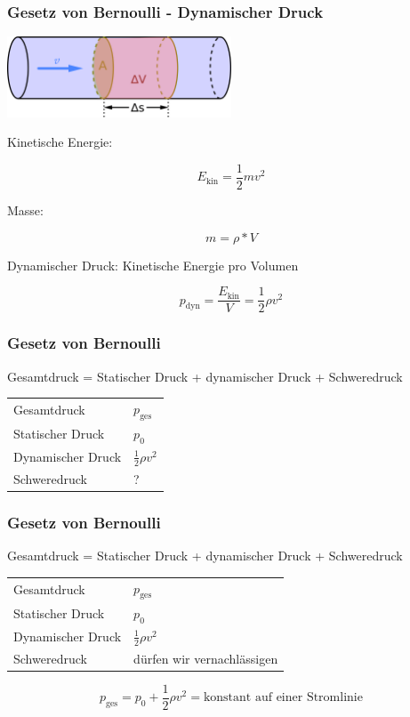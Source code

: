 \documentclass{beamer}
\begin{document}
\begin{frame}
\frametitle{Gesetz von Bernoulli - Dynamischer Druck}

\begin{center}
\includegraphics[width=0.5\textwidth]{volumenstrom.png}
\end{center}

Kinetische Energie:

\[
E_{\text{kin}} = \frac{1}{2} m v^2
\]

\pause
Masse: 

\[
m = \rho * V
\]

\pause
Dynamischer Druck: Kinetische Energie pro Volumen

\[
p_{\text{dyn}} = \frac{E_{\text{kin}}}{V} =  \frac{1}{2} \rho v^2
\]


\end{frame}


\begin{frame}
\frametitle{Gesetz von Bernoulli}



Gesamtdruck = Statischer Druck + dynamischer Druck + Schweredruck \\[0.5 cm]


\begin{tabular}{ll}
Gesamtdruck     & \(p_{\text{ges}}\)     \\[0.2 cm]
Statischer Druck        & \(p_0\)     \\[0.2 cm]
Dynamischer Druck       & \(\frac{1}{2}\rho v^2\) \\[0.2 cm]
Schweredruck    & ? \\
\end{tabular}


\end{frame}


\begin{frame}
\frametitle{Gesetz von Bernoulli}

Gesamtdruck = Statischer Druck + dynamischer Druck + Schweredruck \\[0.5 cm]


\begin{tabular}{ll}
Gesamtdruck     & \(p_{\text{ges}}\)     \\[0.2 cm]
Statischer Druck        & \(p_0\)     \\[0.2 cm]
Dynamischer Druck       & \(\frac{1}{2}\rho v^2\) \\[0.2 cm]
Schweredruck    & dürfen wir vernachlässigen \\[0.5 cm]
\end{tabular}

\pause

\[
p_{\text{ges}} = p_0 + \frac{1}{2}\rho v^2 = \text{konstant auf einer Stromlinie}
\]


\end{frame}
\end{document}
